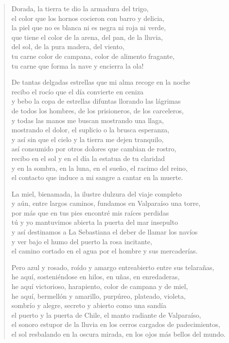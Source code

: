 \documentclass[12pt]{article}
\begin{document}
\begin{verse}
Dorada, la tierra te dio la armadura del trigo,\\
el color que los hornos cocieron con barro y delicia,\\
la piel que no es blanca ni es negra ni roja ni verde,\\
que tiene el color de la arena, del pan, de la lluvia,\\
del sol, de la pura madera, del viento,\\
tu carne color de campana, color de alimento fragante,\\
tu carne que forma la nave y encierra la ola!  

De tantas delgadas estrellas que mi alma recoge en la noche\\
recibo el rocío que el día convierte en ceniza\\
y bebo la copa de estrellas difuntas llorando las lágrimas\\
de todos los hombres, de los prisioneros, de los carceleros,\\
y todas las manos me buscan mostrando una llaga,\\
mostrando el dolor, el suplicio o la brusca esperanza,\\
y así sin que el cielo y la tierra me dejen tranquilo,\\
así consumido por otros dolores que cambian de rostro,\\
recibo en el sol y en el día la estatua de tu claridad\\
y en la sombra, en la luna, en el sueño, el racimo del reino,\\
el contacto que induce a mi sangre a cantar en la muerte.  

La miel, bienamada, la ilustre dulzura del viaje completo\\
y aún, entre largos caminos, fundamos en Valparaíso una torre,\\
por más que en tus pies encontré mis raíces perdidas\\
tú y yo mantuvimos abierta la puerta del mar insepulto\\
y así destinamos a La Sebastiana el deber de llamar los navíos\\
y ver bajo el humo del puerto la rosa incitante,\\
el camino cortado en el agua por el hombre y sus mercaderías.  

Pero azul y rosado, roído y amargo entreabierto entre sus telarañas,\\
he aquí, sosteniéndose en hilos, en uñas, en enredaderas,\\
he aquí victorioso, harapiento, color de campana y de miel,\\
he aquí, bermellón y amarillo, purpúreo, plateado, violeta,\\
sombrío y alegre, secreto y abierto como una sandía\\
el puerto y la puerta de Chile, el manto radiante de Valparaíso,\\
el sonoro estupor de la lluvia en los cerros cargados de padecimientos,\\
el sol resbalando en la oscura mirada, en los ojos más bellos del mundo.  


\end{verse}
\end{document}

